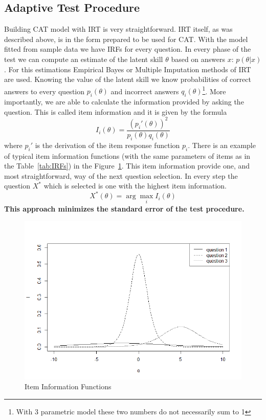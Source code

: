 \subsection{Adaptive Test Procedure}
Building CAT model with IRT is very straightforward. IRT itself, as was described above, is in the form prepared to be used for CAT. With the model fitted from sample data we have IRFs for every question. In every phase of the test we can compute an estimate of the latent skill $\theta$ based on answers $x$: $p(\theta|x)$. For this estimations Empirical Bayes or Multiple Imputation methods of IRT are used. Knowing the value of the latent skill we know probabilities of correct answers to every question $p_i(\theta)$ and incorrect answers $q_i(\theta)$\footnote{With 3 parametric model these two numbers do not necessarily sum to 1}. More importantly, we are able to calculate the information provided by asking the question. This is called item information and it is given by the formula
$$I_i(\theta)=\frac{(p_i'(\theta))^2}{p_i(\theta)q_i(\theta)}$$
where $p_i'$ is the derivation of the item response function $p_i$. There is an example of typical item information functions (with the same parameters of items as in the Table~\ref{tab:IRFs}) in the Figure~\ref{pic:IG}. This item information provide one, and most straightforward, way of the next question selection. In every step the question $X^*$ which is selected is one with the highest item information. 
$$X^*(\theta) = \arg\max_i I_i(\theta)$$
\textbf{This approach minimizes the standard error of the test procedure.}

\begin{figure}%
\includegraphics[width=0.8\columnwidth]{obr/IIs.png}%
\caption{Item Information Functions}%
\label{pic:IG}%
\end{figure}

